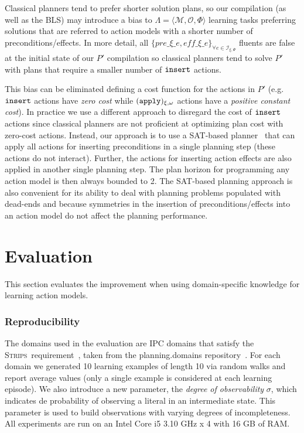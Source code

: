 \documentclass{article}
\newcommand{\tup}[1]{{\langle #1 \rangle}}
\newcommand{\strips}{\textsc{Strips}}
\begin{document}
Classical planners tend to prefer shorter solution plans, so our compilation (as well as the BLS) may introduce a bias to $\Lambda=\tup{\mathcal{M},{\mathcal O},\Phi}$ learning tasks preferring solutions that are referred to action models with a shorter number of preconditions/effects. In more detail, all $\{pre\_\xi\_e, eff\_\xi\_e\}_{\forall e\in{\mathcal I}_{\xi,\Psi}}$ fluents are false at the initial state of our $P'$ compilation so classical planners tend to solve $P'$ with plans that require a smaller number of ${\tt{\small insert}}$ actions.

This bias can be eliminated defining a cost function for the actions in $P'$ (e.g. ${\tt \small insert}$ actions have {\em zero cost} while ${\tt \small (apply)_{\xi,\omega}}$ actions have a {\em positive constant cost}). In practice we use a different approach to disregard the cost of ${\tt \small insert}$ actions since classical planners are not proficient at optimizing plan cost with zero-cost actions. Instead, our approach is to use a SAT-based planner~\cite{rintanen2014madagascar} that can apply all actions for inserting preconditions in a single planning step (these actions do not interact). Further, the actions for inserting action effects are also applied in another single planning step. The plan horizon for programming any action model is then always bounded to 2. The SAT-based planning approach is also convenient for its ability to deal with planning problems populated with dead-ends and because symmetries in the insertion of preconditions/effects into an action model do not affect the planning performance.



\section{Evaluation}
\label{sec:evaluation}
This section evaluates the improvement when using domain-specific knowledge for learning action models.

\subsubsection{Reproducibility}
The domains used in the evaluation are IPC domains that satisfy the \strips\ requirement~\cite{fox2003pddl2}, taken from the {\sc planning.domains} repository~\cite{muise2016planning}. For each domain we generated 10 learning examples of length 10 via random walks and report average values (only a single example is considered at each learning episode). We also introduce a new parameter, the {\em degree of observability} $\sigma$, which indicates de probability of observing a literal in an intermediate state. This parameter is used to build observations with varying degrees of incompleteness. All experiments are run on an Intel Core i5 3.10 GHz x 4 with 16 GB of RAM.
\end{document}
